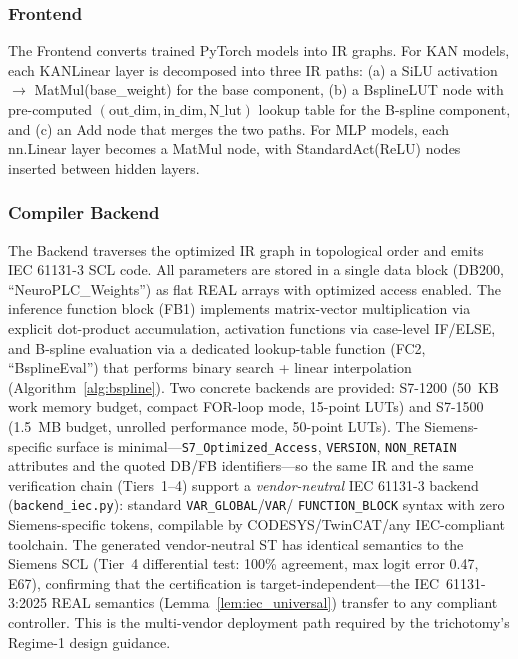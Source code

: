 \documentclass[journal,onecolumn]{IEEEtran}
\begin{document}
\subsubsection{Frontend}

The Frontend converts trained PyTorch models into IR graphs. For KAN models,
each KANLinear layer is decomposed into three IR paths: (a) a SiLU activation
$\rightarrow$ MatMul(base\_weight) for the base component, (b) a BsplineLUT
node with pre-computed $(\text{out\_dim},\text{in\_dim},\text{N\_lut})$
lookup table for the B-spline component, and (c) an Add node that merges
the two paths. For MLP models, each nn.Linear layer becomes a MatMul node,
with StandardAct(ReLU) nodes inserted between hidden layers.

\subsubsection{Compiler Backend}

The Backend traverses the optimized IR graph in topological order and emits
IEC 61131-3 SCL code. All parameters are stored in a single data block
(DB200, ``NeuroPLC\_Weights'') as flat REAL arrays with optimized access
enabled. The inference function block (FB1) implements matrix-vector
multiplication via explicit dot-product accumulation, activation functions
via case-level IF/ELSE, and B-spline evaluation via a dedicated lookup-table
function (FC2, ``BsplineEval'') that performs binary search + linear
interpolation (Algorithm~\ref{alg:bspline}). Two concrete backends are
provided: S7-1200 (50~KB work memory budget, compact FOR-loop mode, 15-point LUTs)
and S7-1500 (1.5~MB budget, unrolled performance mode, 50-point LUTs).
The Siemens-specific surface is minimal---\texttt{S7\_Optimized\_Access},
\texttt{VERSION}, \texttt{NON\_RETAIN} attributes and the quoted
DB/FB identifiers---so the same IR and the same verification chain
(Tiers~1--4) support a \emph{vendor-neutral} IEC 61131-3 backend
(\texttt{backend\_iec.py}): standard \texttt{VAR\_GLOBAL}/\texttt{VAR}/
\texttt{FUNCTION\_BLOCK} syntax with zero Siemens-specific tokens,
compilable by CODESYS/TwinCAT/any IEC-compliant toolchain. The generated
vendor-neutral ST has identical semantics to the Siemens SCL
(Tier~4 differential test: 100\% agreement, max logit error 0.47, E67),
confirming that the certification is target-independent---the
IEC~61131-3:2025 REAL semantics (Lemma~\ref{lem:iec_universal}) transfer
to any compliant controller. This is the multi-vendor deployment path
required by the trichotomy's Regime-1 design guidance.
\end{document}
